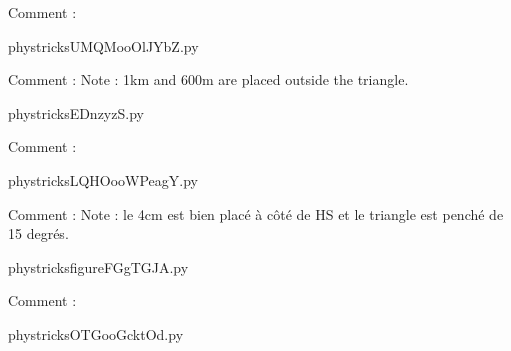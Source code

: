     Comment : 

    \clearpage
    


    \newcommand{\CaptionFigUMQMooOlJYbZ}{<+Type your caption here+>}
    \begin{center}
        
    \end{center}
    phystricksUMQMooOlJYbZ.py

    Comment : Note : 1km and 600m are placed outside the triangle.

    \clearpage
    


    \newcommand{\CaptionFigEDnzyzS}{<+Type your caption here+>}
    \begin{center}
        
    \end{center}
    phystricksEDnzyzS.py

    Comment : 

    \clearpage
    


    \newcommand{\CaptionFigLQHOooWPeagY}{<+Type your caption here+>}
    \begin{center}
        
    \end{center}
    phystricksLQHOooWPeagY.py

    Comment : Note : le 4cm est bien placé à côté de HS et le triangle est penché de 15 degrés.

    \clearpage
    


    \newcommand{\CaptionFigfigureFGgTGJA}{<+Type your caption here+>}
    \begin{center}
        
    \end{center}
    phystricksfigureFGgTGJA.py

    Comment : 

    \clearpage
    


    \newcommand{\CaptionFigOTGooGcktOd}{<+Type your caption here+>}
    \begin{center}
        
    \end{center}
    phystricksOTGooGcktOd.py

